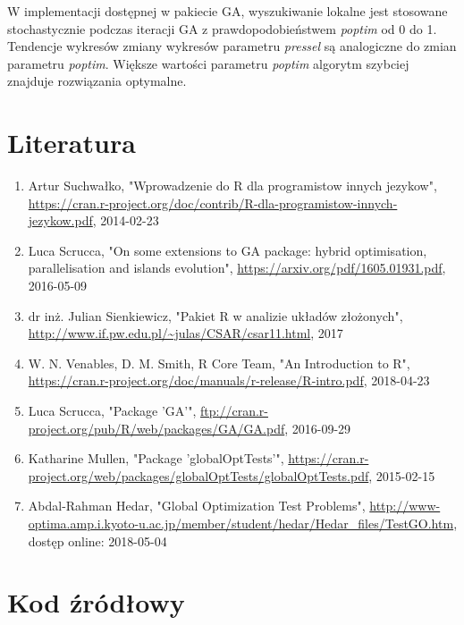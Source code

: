 \documentclass{article}
\begin{document}
W implementacji dostępnej w pakiecie GA, wyszukiwanie lokalne jest stosowane stochastycznie podczas iteracji GA z prawdopodobieństwem \textit{poptim}  od 0 do 1. Tendencje wykresów zmiany wykresów parametru \textit{pressel} są analogiczne do zmian parametru \textit{poptim}. Większe wartości parametru \textit{poptim} algorytm szybciej znajduje rozwiązania optymalne.
        

\newpage

\section{Literatura}
\begin{enumerate}
\item Artur Suchwałko, "Wprowadzenie do R dla programistow innych jezykow", \url{https://cran.r-project.org/doc/contrib/R-dla-programistow-innych-jezykow.pdf}, 2014-02-23
\item Luca Scrucca, "On some extensions to GA package:
hybrid optimisation, parallelisation and islands evolution", \url{https://arxiv.org/pdf/1605.01931.pdf}, 2016-05-09
\item dr inż. Julian Sienkiewicz, "Pakiet R w analizie układów złożonych", \url{http://www.if.pw.edu.pl/~julas/CSAR/csar11.html}, 2017
\item W. N. Venables, D. M. Smith, R Core Team, "An Introduction to R", \url{https://cran.r-project.org/doc/manuals/r-release/R-intro.pdf}, 2018-04-23
\item Luca Scrucca, "Package 'GA'", \url{ftp://cran.r-project.org/pub/R/web/packages/GA/GA.pdf}, 2016-09-29
\item Katharine Mullen, "Package 'globalOptTests'", \url{https://cran.r-project.org/web/packages/globalOptTests/globalOptTests.pdf},
2015-02-15
\item Abdal-Rahman Hedar, "Global Optimization Test Problems", \url{http://www-optima.amp.i.kyoto-u.ac.jp/member/student/hedar/Hedar_files/TestGO.htm}, dostęp online: 2018-05-04
\end{enumerate}


\newpage
\section{Kod źródłowy}
\lstset{
language=R,
extendedchars=true,
inputencoding=latin1,
basicstyle=\small
}





\end{document}
